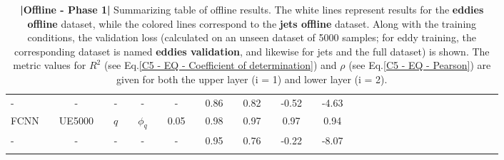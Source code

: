 \begin{table}[H]
\begin{tabular}{llclclclclclclclclclclclclclclcl}
-     		&  & -                  &  & -            &   &  -                                       &  &  -           &  & 0.86      &  & 0.82      &  & -0.52    &  & -4.63          \\ 
FCNN      &  & UE5000      &  & $q$       &   & $\phi_q $                          &  & 0.05      &  & 0.98      &  & 0.97      &  & 0.97      &  & 0.94             \\ \rowcolor{Blue}
-     		&  & -                  &  & -            &   &  -                                          &  &  -           &  & 0.95      &  & 0.76      &  & -0.22    &  & -8.07             \\ [0.4em]
\Xhline{1.5pt}\\[-0.8em]      
\end{tabular}
\caption{\textbf{|}\textcolor{section_color}{\textbf{Offline - Phase 1}}\textbf{|} Summarizing table of offline results. The white lines represent results for the \textbf{eddies offline} dataset, while the colored lines correspond to the \textbf{jets offline} dataset. Along with the training conditions, the validation loss (calculated on an unseen dataset of 5000 samples; for eddy training, the corresponding dataset is named \textbf{eddies validation}, and likewise for jets and the full dataset) is shown. The metric values for $R^2$ (see Eq.\ref{C5 - EQ - Coefficient of determination}) and $\rho$ (see Eq.\ref{C5 - EQ - Pearson}) are given for both the upper layer (i = 1) and lower layer (i = 2).}
\label{C5 - TAB - PHASE 1}
\end{table}
\bgroup